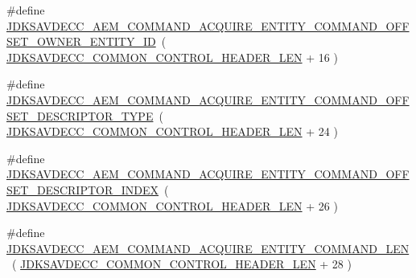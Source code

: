 \begin{DoxyCompactItemize}
\#define \hyperlink{group__command__acquire__entity_ga66cb50bbcb2094cd470948270d501363}{J\+D\+K\+S\+A\+V\+D\+E\+C\+C\+\_\+\+A\+E\+M\+\_\+\+C\+O\+M\+M\+A\+N\+D\+\_\+\+A\+C\+Q\+U\+I\+R\+E\+\_\+\+E\+N\+T\+I\+T\+Y\+\_\+\+C\+O\+M\+M\+A\+N\+D\+\_\+\+O\+F\+F\+S\+E\+T\+\_\+\+O\+W\+N\+E\+R\+\_\+\+E\+N\+T\+I\+T\+Y\+\_\+\+ID}~( \hyperlink{group__jdksavdecc__avtp__common__control__header_gaae84052886fb1bb42f3bc5f85b741dff}{J\+D\+K\+S\+A\+V\+D\+E\+C\+C\+\_\+\+C\+O\+M\+M\+O\+N\+\_\+\+C\+O\+N\+T\+R\+O\+L\+\_\+\+H\+E\+A\+D\+E\+R\+\_\+\+L\+EN} + 16 )
\item 
\#define \hyperlink{group__command__acquire__entity_gae192362bfd72c523d675a3ffb5347f77}{J\+D\+K\+S\+A\+V\+D\+E\+C\+C\+\_\+\+A\+E\+M\+\_\+\+C\+O\+M\+M\+A\+N\+D\+\_\+\+A\+C\+Q\+U\+I\+R\+E\+\_\+\+E\+N\+T\+I\+T\+Y\+\_\+\+C\+O\+M\+M\+A\+N\+D\+\_\+\+O\+F\+F\+S\+E\+T\+\_\+\+D\+E\+S\+C\+R\+I\+P\+T\+O\+R\+\_\+\+T\+Y\+PE}~( \hyperlink{group__jdksavdecc__avtp__common__control__header_gaae84052886fb1bb42f3bc5f85b741dff}{J\+D\+K\+S\+A\+V\+D\+E\+C\+C\+\_\+\+C\+O\+M\+M\+O\+N\+\_\+\+C\+O\+N\+T\+R\+O\+L\+\_\+\+H\+E\+A\+D\+E\+R\+\_\+\+L\+EN} + 24 )
\item 
\#define \hyperlink{group__command__acquire__entity_gac78625b3b547afd943cf9d5fbaa48242}{J\+D\+K\+S\+A\+V\+D\+E\+C\+C\+\_\+\+A\+E\+M\+\_\+\+C\+O\+M\+M\+A\+N\+D\+\_\+\+A\+C\+Q\+U\+I\+R\+E\+\_\+\+E\+N\+T\+I\+T\+Y\+\_\+\+C\+O\+M\+M\+A\+N\+D\+\_\+\+O\+F\+F\+S\+E\+T\+\_\+\+D\+E\+S\+C\+R\+I\+P\+T\+O\+R\+\_\+\+I\+N\+D\+EX}~( \hyperlink{group__jdksavdecc__avtp__common__control__header_gaae84052886fb1bb42f3bc5f85b741dff}{J\+D\+K\+S\+A\+V\+D\+E\+C\+C\+\_\+\+C\+O\+M\+M\+O\+N\+\_\+\+C\+O\+N\+T\+R\+O\+L\+\_\+\+H\+E\+A\+D\+E\+R\+\_\+\+L\+EN} + 26 )
\item 
\#define \hyperlink{group__command__acquire__entity_gacd48c850101d4deef27e5c003f1c54cb}{J\+D\+K\+S\+A\+V\+D\+E\+C\+C\+\_\+\+A\+E\+M\+\_\+\+C\+O\+M\+M\+A\+N\+D\+\_\+\+A\+C\+Q\+U\+I\+R\+E\+\_\+\+E\+N\+T\+I\+T\+Y\+\_\+\+C\+O\+M\+M\+A\+N\+D\+\_\+\+L\+EN}~( \hyperlink{group__jdksavdecc__avtp__common__control__header_gaae84052886fb1bb42f3bc5f85b741dff}{J\+D\+K\+S\+A\+V\+D\+E\+C\+C\+\_\+\+C\+O\+M\+M\+O\+N\+\_\+\+C\+O\+N\+T\+R\+O\+L\+\_\+\+H\+E\+A\+D\+E\+R\+\_\+\+L\+EN} + 28 )
\end{DoxyCompactItemize}
